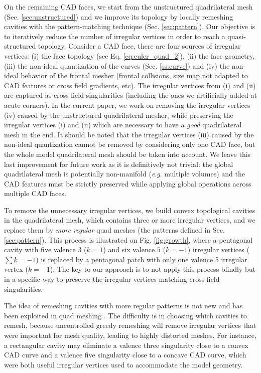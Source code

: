 \documentclass[AMA,STIX1COL]{WileyNJD-v2}
\newcommand{\eg}{\textit{e}.\textit{g}. }
\newcommand\rsec[1]{Sec. \ref{#1}}
\newcommand\reqt[1]{Eq. \ref{#1}}
\newcommand\rfig[1]{Fig. \ref{#1}}
\begin{document}
{On the remaining CAD faces, we start from the unstructured
quadrilateral mesh (\rsec{sec:unstructured}) and we improve its topology by locally
remeshing cavities with the pattern-matching technique (\rsec{sec:pattern}).
Our objective is to iteratively reduce the number
of irregular vertices in order to reach a quasi-structured topology. Consider a
CAD face, there are four sources of irregular vertices: (i) the face
topology (see \reqt{eq:euler_quad_2}), (ii) the face geometry, (iii) the non-ideal
quantization of the curves (\rsec{ss:curve}) and (iv) the non-ideal behavior of the
frontal mesher (frontal collisions, size map not adapted to CAD
features or cross field gradients, etc). The irregular vertices from (i) and (ii) are captured as
cross field singularities (including the ones we artificially added at acute corners).
In the current paper, we work on removing the irregular vertices
(iv) caused by the unstructured quadrilateral mesher, while preserving the
irregular vertices (i) and (ii) which are necessary to have a \emph{good}
quadrilateral mesh in the end.
It should be noted that the irregular vertices (iii) caused by the non-ideal quantization cannot be
removed by considering only one CAD face, but the whole model
quadrilateral mesh should be taken into account. We leave this last improvement for future
work as it is definitively not trivial: the global quadrilateral mesh is potentially
non-manifold (\eg multiple volumes) and the CAD features must be strictly preserved
while applying global operations across multiple CAD faces.

To remove the unnecessary irregular vertices, we build convex topological cavities
in the quadrilateral mesh, which contains three or more irregular vertices, and
we replace them by \emph{more regular} quad meshes 
(the patterns defined in \rsec{sec:pattern}).
This process is illustrated
on \rfig{fig:growth}, where a pentagonal cavity with five valence $3$ ($k=1$)
and six valence $5$ ($k=-1$) irregular vertices ($\sum k = -1$) is replaced by
a pentagonal patch with only one valence 5 irregular vertex ($k=-1$). The key
to our approach is to not apply this process blindly but in a specific way to
preserve the irregular vertices matching cross field singularities.

The idea of remeshing cavities with more regular patterns is not new
\cite{bunin2008,takayama2014} and has been exploited in quad meshing 
\cite{jaal,marcias2015,verma2015}. The
difficulty is in choosing which cavities to remesh, because 
uncontrolled greedy remeshing will remove irregular
vertices that were important for mesh quality, leading to highly distorted meshes. For instance,
a rectangular cavity may eliminate a valence three singularity close
to a convex CAD curve and a valence five singularity close to a concave
CAD curve, which were both useful irregular vertices used to accommodate
the model geometry.

}
\end{document}
